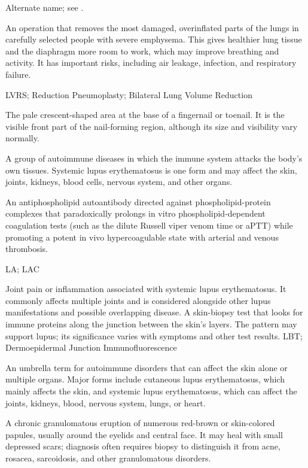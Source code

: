  Alternate name; see .

 An operation that removes the most damaged, overinflated parts of the lungs in carefully selected people with severe emphysema. This gives healthier lung tissue and the diaphragm more room to work, which may improve breathing and activity. It has important risks, including air leakage, infection, and respiratory failure.

\synonyms
LVRS; Reduction Pneumoplasty; Bilateral Lung Volume Reduction

 The pale crescent-shaped area at the base of a fingernail or toenail. It is the visible front part of the nail-forming region, although its size and visibility vary normally.

 A group of autoimmune diseases in which the immune system attacks the body's own
tissues. Systemic lupus erythematosus is one form and may affect the skin, joints, kidneys,
blood cells, nervous system, and other organs.

 An antiphospholipid autoantibody directed against phospholipid-protein complexes that paradoxically prolongs in vitro phospholipid-dependent coagulation tests (such as the dilute Russell viper venom time or aPTT) while promoting a potent in vivo hypercoagulable state with arterial and venous thrombosis.

\synonyms
LA; LAC

 Joint pain or inflammation associated with systemic lupus erythematosus. It commonly affects multiple joints and is considered alongside other lupus manifestations and possible overlapping disease.
 A skin-biopsy test that looks for immune proteins along the junction between the skin's layers. The pattern may support lupus; its significance varies with symptoms and other test results.
\synonyms
LBT; Dermoepidermal Junction Immunofluorescence

 An umbrella term for autoimmune disorders that can affect the skin alone or multiple organs. Major forms include cutaneous lupus erythematosus, which mainly affects the skin, and systemic lupus erythematosus, which can affect the joints, kidneys, blood, nervous system, lungs, or heart.

 A chronic granulomatous eruption of numerous red-brown or skin-colored papules, usually around the eyelids and central face. It may heal with small depressed scars; diagnosis often requires biopsy to distinguish it from acne, rosacea, sarcoidosis, and other granulomatous disorders.

